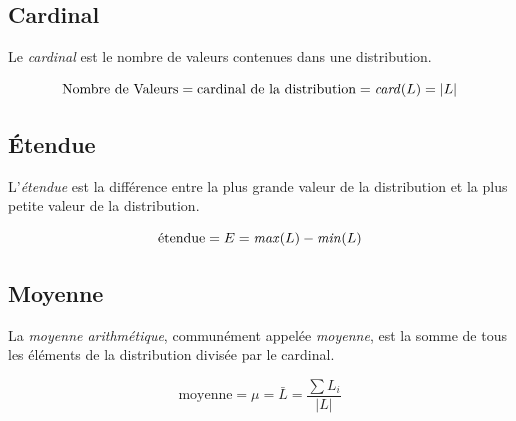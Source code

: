 
\subsection{Cardinal}

\noindent Le \textit{cardinal} est le nombre de valeurs contenues dans une distribution.

\begin{center}
\begin{equation*}
\text{Nombre de Valeurs} = \text{cardinal de la distribution} = \text{\textit{card}}(L) = |L|
\end{equation*}
\end{center}


\bigskip


\subsection{\'Etendue}

\noindent L'\textit{étendue} est la différence entre la plus grande valeur de la distribution et la plus petite valeur de la distribution.

\begin{center} %
\begin{equation*}
\text{étendue} = E = \text{\textit{max}}(L) - \text{\textit{min}}(L)
\end{equation*}
\end{center}


\bigskip


\subsection{Moyenne}

\noindent La \textit{moyenne arithmétique}, communément appelée \textit{moyenne}, est la somme de tous les éléments de la distribution divisée par le cardinal.

\begin{center} %
\[
\text{moyenne} = \mu = \bar{L} = \frac{\displaystyle \sum L_{i}}{|L|}
\]
\end{center}



\bigskip


